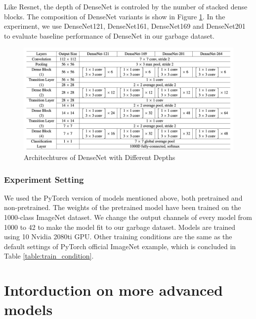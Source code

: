 Like Resnet, the depth of DenseNet is controled by the number of stacked dense blocks. The composition of DenseNet variants is show in Figure \ref{fig:dense_arch}. In the experiment, we use DenseNet121, DenseNet161, DenseNet169 and DenseNet201 to evaluate baseline performance of DenseNet in our garbage dataset.


\begin{figure}[ht]
	\centering
	\includegraphics[width=\linewidth]{figs/dense_arch.png}
	\caption{Architechtures of DenseNet with Different Depths\cite{densenet2017}}
	\label{fig:dense_arch}
\end{figure}

\subsubsection{Experiment Setting}
We used the PyTorch version of models mentioned above, both pretrained and non-pretrained. The weights of the pretrained model have been trained on the 1000-class ImageNet dataset. We change the output channels of every model from 1000 to 42 to make the model fit to our garbage dataset. Models are trained using 10 Nvidia 2080ti GPU. Other training conditions are the same as the default settings of PyTorch official ImageNet example, which is concluded in Table \ref{table:train_condition}.

\section{Intorduction on more advanced models}
